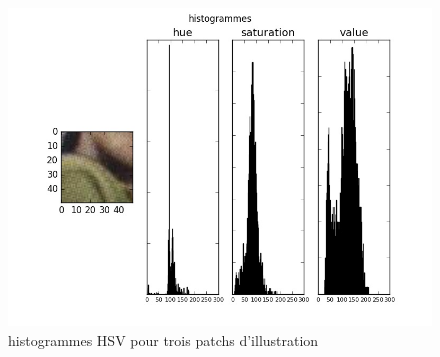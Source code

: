 \documentclass{book}
\begin{document}
\begin{figure}[H]
\begin{center}
\includegraphics[scale=0.4]{images/histo_hsv_image3.jpg}
\end{center}
\caption{histogrammes HSV pour trois patchs d'illustration}
\label{histo_hsv_illustration}
\end{figure}
\end{document}
